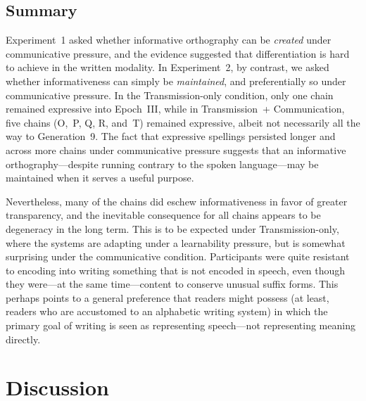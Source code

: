 \documentclass[doc,biblatex]{apa7}
\begin{document}
\subsection{Summary}

Experiment~1 asked whether informative orthography can be \textit{created} under communicative pressure, and the evidence suggested that differentiation is hard to achieve in the written modality. In Experiment~2, by contrast, we asked whether informativeness can simply be \textit{maintained}, and preferentially so under communicative pressure. In the Transmission-only condition, only one chain remained expressive into Epoch~III, while in Transmission~+ Communication, five chains (O,~P, Q, R, and~T) remained expressive, albeit not necessarily all the way to Generation~9. The fact that expressive spellings persisted longer and across more chains under communicative pressure suggests that an informative orthography---despite running contrary to the spoken language---may be maintained when it serves a useful purpose.

Nevertheless, many of the chains did eschew informativeness in favor of greater transparency, and the inevitable consequence for all chains appears to be degeneracy in the long term. This is to be expected under Transmission-only, where the systems are adapting under a learnability pressure, but is somewhat surprising under the communicative condition. Participants were quite resistant to encoding into writing something that is not encoded in speech, even though they were---at the same time---content to conserve unusual suffix forms. This perhaps points to a general preference that readers might possess (at least, readers who are accustomed to an alphabetic writing system) in which the primary goal of writing is seen as representing speech---not representing meaning directly.


\section{Discussion}
\end{document}
